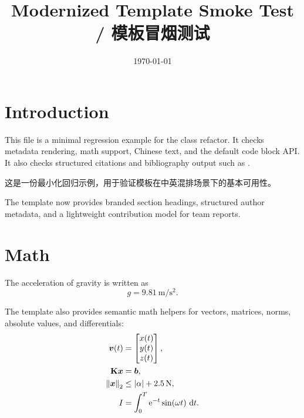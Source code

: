 \documentclass[titlepage=formal,logo=assets/校徽+中英文校名-上下.pdf,code=listings]{SUSTechHomework}
\title{Modernized Template Smoke Test / 模板冒烟测试}
\date{\today}
\begin{document}
\clearauthors
{}

\clearcontributions
{}

\clearcredits
{}

\maketitle
\tableofcontents

\section{Introduction}\label{sec:introduction}

This file is a minimal regression example for the class refactor.
It checks metadata rendering, math support, Chinese text, and the default code block API.
It also checks structured citations and bibliography output such as \textcite{lamport1994latex}.

这是一份最小化回归示例，用于验证模板在中英混排场景下的基本可用性。

\begin{sustechnote}[title=Design Note]
The template now provides branded section headings, structured author metadata,
and a lightweight contribution model for team reports.
\end{sustechnote}

\section{Math}\label{sec:math}

The acceleration of gravity is written as
\[
  g = \qty{9.81}{\meter\per\second\squared}.
\]

The template also provides semantic math helpers for vectors, matrices, norms,
absolute values, and differentials:
\begin{align}
  \vect{v}(t) &= \begin{bmatrix} x(t) \\ y(t) \\ z(t) \end{bmatrix}, \\
  \mat{K}\vect{x} &= \vect{b}, \\
  \norm*{\vect{x}}_2 &\le \abs*{\alpha} + \qty{2.5}{\newton}, \\
  I &= \int_{0}^{T} \e^{-t} \sin(\omega t)\,\diff t. \label{eq:response-energy}
\end{align}
\end{document}
